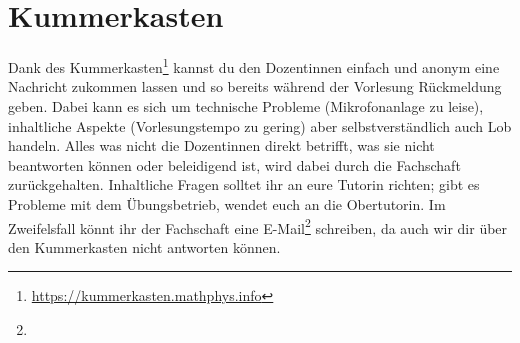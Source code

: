 \section{Kummerkasten}
\label{kummerkasten}

Dank des Kummerkasten\footnote{\url{https://kummerkasten.mathphys.info}} kannst du den Dozentinnen einfach und anonym eine Nachricht zukommen lassen und so bereits während der Vorlesung Rückmeldung geben. Dabei kann es sich um technische Probleme (Mikrofonanlage zu leise), inhaltliche Aspekte (Vorlesungstempo zu gering) aber selbstverständlich auch Lob handeln. Alles was nicht die Dozentinnen direkt betrifft, was sie nicht beantworten können oder beleidigend ist, wird dabei durch die Fachschaft zurückgehalten. Inhaltliche Fragen solltet ihr an eure Tutorin richten; gibt es Probleme mit dem Übungsbetrieb, wendet euch an die Obertutorin. Im Zweifelsfall könnt ihr der Fachschaft eine E-Mail\footnote{} schreiben, da auch wir dir über den Kummerkasten nicht antworten können.
